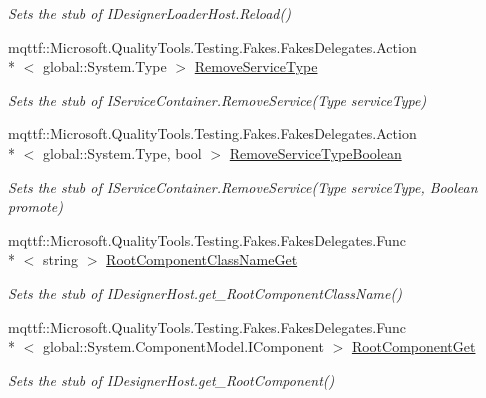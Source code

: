 \begin{DoxyCompactItemize}
\begin{DoxyCompactList}\small\item\em Sets the stub of I\-Designer\-Loader\-Host.\-Reload()\end{DoxyCompactList}\item 
mqttf\-::\-Microsoft.\-Quality\-Tools.\-Testing.\-Fakes.\-Fakes\-Delegates.\-Action\\*
$<$ global\-::\-System.\-Type $>$ \hyperlink{class_system_1_1_component_model_1_1_design_1_1_serialization_1_1_fakes_1_1_stub_i_designer_loader_host_a30a93ba4f36ec80b60aadc9b311846dd}{Remove\-Service\-Type}
\begin{DoxyCompactList}\small\item\em Sets the stub of I\-Service\-Container.\-Remove\-Service(\-Type service\-Type)\end{DoxyCompactList}\item 
mqttf\-::\-Microsoft.\-Quality\-Tools.\-Testing.\-Fakes.\-Fakes\-Delegates.\-Action\\*
$<$ global\-::\-System.\-Type, bool $>$ \hyperlink{class_system_1_1_component_model_1_1_design_1_1_serialization_1_1_fakes_1_1_stub_i_designer_loader_host_a61f005908febdf1ab7e712ae102309a1}{Remove\-Service\-Type\-Boolean}
\begin{DoxyCompactList}\small\item\em Sets the stub of I\-Service\-Container.\-Remove\-Service(\-Type service\-Type, Boolean promote)\end{DoxyCompactList}\item 
mqttf\-::\-Microsoft.\-Quality\-Tools.\-Testing.\-Fakes.\-Fakes\-Delegates.\-Func\\*
$<$ string $>$ \hyperlink{class_system_1_1_component_model_1_1_design_1_1_serialization_1_1_fakes_1_1_stub_i_designer_loader_host_aad24ef95c6256fef9900836884c35a8c}{Root\-Component\-Class\-Name\-Get}
\begin{DoxyCompactList}\small\item\em Sets the stub of I\-Designer\-Host.\-get\-\_\-\-Root\-Component\-Class\-Name()\end{DoxyCompactList}\item 
mqttf\-::\-Microsoft.\-Quality\-Tools.\-Testing.\-Fakes.\-Fakes\-Delegates.\-Func\\*
$<$ global\-::\-System.\-Component\-Model.\-I\-Component $>$ \hyperlink{class_system_1_1_component_model_1_1_design_1_1_serialization_1_1_fakes_1_1_stub_i_designer_loader_host_a815e551726e202cd2d7515b071f060e1}{Root\-Component\-Get}
\begin{DoxyCompactList}\small\item\em Sets the stub of I\-Designer\-Host.\-get\-\_\-\-Root\-Component()\end{DoxyCompactList}\item 

\end{DoxyCompactItemize}
